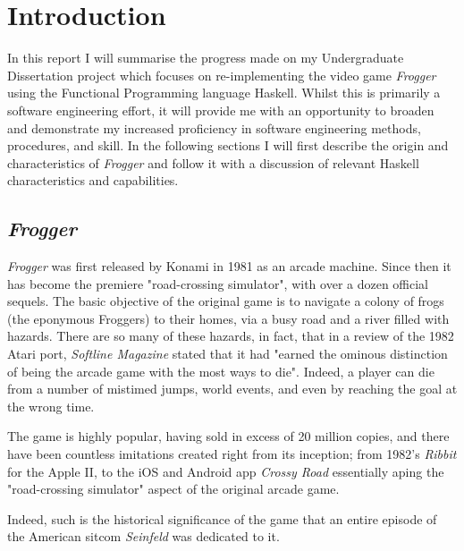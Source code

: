 \documentclass[12pt, a4paper]{report}
\begin{document}
\maketitle

\tableofcontents
\pagebreak

\section{Introduction}
In this report I will summarise the progress made on my Undergraduate Dissertation project which focuses on re-implementing the video game \textit{Frogger} using the Functional Programming language Haskell.
Whilst this is primarily a software engineering effort, it will provide me with an opportunity to broaden and demonstrate my increased proficiency in software engineering methods, procedures, and skill.
In the following sections I will first describe the origin and characteristics of \textit{Frogger} and follow it with a discussion of relevant Haskell characteristics and capabilities.

\subsection{\textit{Frogger}}
\textit{Frogger} was first released by Konami in 1981 as an arcade machine.
Since then it has become the premiere "road-crossing simulator", with over a dozen official sequels.
The basic objective of the original game is to navigate a colony of frogs (the eponymous Froggers) to their homes, via a busy road and a river filled with hazards.
There are so many of these hazards, in fact, that in a review of the 1982 Atari port, \textit{Softline Magazine} stated that it had "earned the ominous distinction of being the arcade game with the most ways to die"\cite{softline}. Indeed, a player can die from a number of mistimed jumps, world events, and even by reaching the goal at the wrong time.

\par

The game is highly popular, having sold in excess of 20 million copies\cite{konamipressrelease}, and there have been countless imitations created right from its inception; from 1982's \textit{Ribbit} for the Apple II, to the iOS and Android app \textit{Crossy Road} essentially aping the "road-crossing simulator" aspect of the original arcade game.

Indeed, such is the historical significance of the game that an entire episode of the American sitcom \textit{Seinfeld} was dedicated to it\cite{seinfeld}.
\end{document}
